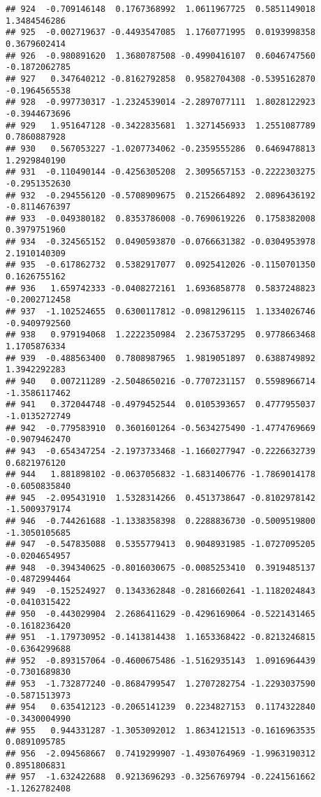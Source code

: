 \documentclass[
]{article}
\begin{document}
\begin{verbatim}
## 924  -0.709146148  0.1767368992  1.0611967725  0.5851149018  1.3484546286
## 925  -0.002719637 -0.4493547085  1.1760771995  0.0193998358  0.3679602414
## 926  -0.980891620  1.3680787508 -0.4990416107  0.6046747560 -0.1872062785
## 927   0.347640212 -0.8162792858  0.9582704308 -0.5395162870 -0.1964565538
## 928  -0.997730317 -1.2324539014 -2.2897077111  1.8028122923 -0.3944673696
## 929   1.951647128 -0.3422835681  1.3271456933  1.2551087789  0.7860887928
## 930   0.567053227 -1.0207734062 -0.2359555286  0.6469478813  1.2929840190
## 931  -0.110490144 -0.4256305208  2.3095657153 -0.2222303275 -0.2951352630
## 932  -0.294556120 -0.5708909675  0.2152664892  2.0896436192 -0.8114676397
## 933  -0.049380182  0.8353786008 -0.7690619226  0.1758382008  0.3979751960
## 934  -0.324565152  0.0490593870 -0.0766631382 -0.0304953978  2.1910140309
## 935  -0.617862732  0.5382917077  0.0925412026 -0.1150701350  0.1626755162
## 936   1.659742333 -0.0408272161  1.6936858778  0.5837248823 -0.2002712458
## 937  -1.102524655  0.6300117812 -0.0981296115  1.1334026746 -0.9409792560
## 938   0.979194068  1.2222350984  2.2367537295  0.9778663468  1.1705876334
## 939  -0.488563400  0.7808987965  1.9819051897  0.6388749892  1.3942292283
## 940   0.007211289 -2.5048650216 -0.7707231157  0.5598966714 -1.3586117462
## 941   0.372044748 -0.4979452544  0.0105393657  0.4777955037 -1.0135272749
## 942  -0.779583910  0.3601601264 -0.5634275490 -1.4774769669 -0.9079462470
## 943  -0.654347254 -2.1973733468 -1.1660277947 -0.2226632739  0.6821976120
## 944   1.881898102 -0.0637056832 -1.6831406776 -1.7869014178 -0.6050835840
## 945  -2.095431910  1.5328314266  0.4513738647 -0.8102978142 -1.5009379174
## 946  -0.744261688 -1.1338358398  0.2288836730 -0.5009519800 -1.3050105685
## 947  -0.547835088  0.5355779413  0.9048931985 -1.0727095205 -0.0204654957
## 948  -0.394340625 -0.8016030675 -0.0085253410  0.3919485137 -0.4872994464
## 949  -0.152524927  0.1343362848 -0.2816602641 -1.1182024843 -0.0410315422
## 950  -0.443029904  2.2686411629 -0.4296169064 -0.5221431465 -0.1618236420
## 951  -1.179730952 -0.1413814438  1.1653368422 -0.8213246815 -0.6364299688
## 952  -0.893157064 -0.4600675486 -1.5162935143  1.0916964439 -0.7301689830
## 953  -1.732877240 -0.8684799547  1.2707282754 -1.2293037590 -0.5871513973
## 954   0.635412123 -0.2065141239  0.2234827153  0.1174322840 -0.3430004990
## 955   0.944331287 -1.3053092012  1.8634121513 -0.1616963535  0.0891095785
## 956  -2.094568667  0.7419299907 -1.4930764969 -1.9963190312  0.8951806831
## 957  -1.632422688  0.9213696293 -0.3256769794 -0.2241561662 -1.1262782408

\end{verbatim}
\end{document}

